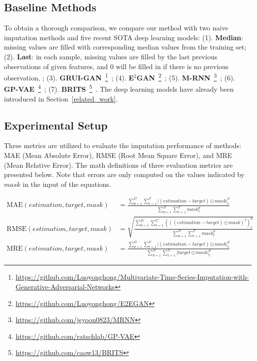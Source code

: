 \documentclass{article}
\begin{document}
\subsection{Baseline Methods}
To obtain a thorough comparison, we compare our method with two naive imputation methods and five recent SOTA deep learning models: 
(1). \textbf{Median}: missing values are filled with corresponding median values from the training set; (2). \textbf{Last}: in each sample, missing values are filled by the last previous observations of given features, and 0 will be filled in if there is no previous observation, ; (3). \textbf{GRUI-GAN}~\footnote{\url{https://github.com/Luoyonghong/Multivariate-Time-Series-Imputation-with-Generative-Adversarial-Networks}}~\cite{Luo2018GRUI}; (4). \textbf{E$^2$GAN}~\footnote{\url{https://github.com/Luoyonghong/E2EGAN}}~\cite{Luo2019E2GAN}; (5). \textbf{M-RNN}~\footnote{\url{https://github.com/jsyoon0823/MRNN}}~\cite{Yoon2019MRNN}; (6). \textbf{GP-VAE}~\footnote{\url{https://github.com/ratschlab/GP-VAE}}~\cite{Fortuin2020GPVAE}; (7). \textbf{BRITS}~\footnote{\url{https://github.com/caow13/BRITS}}~\cite{Cao2018BRITS}. The deep learning models have already been introduced in Section~\ref{related_work}.

\subsection{Experimental Setup}	\label{experimental_setup}
Three metrics are utilized to evaluate the imputation performance of methods: MAE (Mean Absolute Error), RMSE (Root Mean Square Error), and MRE (Mean Relative Error). The math definitions of three evaluation metrics are presented below. Note that errors are only computed on the values indicated by $mask$ in the input of the equations.

\begin{align*}
	\text{MAE}\left(estimation, target, mask \right) &= \frac{\sum_{d=1}^D \sum_{t=1}^T \lvert \left(estimation - target \right)\odot mask\rvert_t^d}{\sum_{d=1}^D \sum_{t=1}^T mask_t^d} \\
	\text{RMSE}\left(estimation, target, mask \right)&= \sqrt{\frac{\sum_{d=1}^D \sum_{t=1}^T \left(\left(\left(estimation - target\right) \odot mask \right)^2\right)_t^d}{\sum_{d=1}^D \sum_{t=1}^T mask_t^d}} \\
	\text{MRE}\left(estimation, target, mask \right) &= \frac{\sum_{d=1}^D \sum_{t=1}^T \lvert \left( estimation - target \right) \odot mask \rvert_t^d}{\sum_{d=1}^D \sum_{t=1}^T |target \odot mask |_t^d}
\end{align*}
\end{document}

